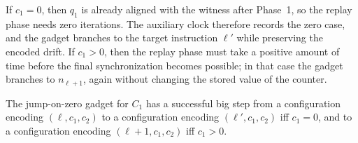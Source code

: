 If $c_1=0$, then $q_1$ is already aligned with the witness after Phase~1, so
the replay phase needs zero iterations.  The auxiliary clock therefore records
the zero case, and the gadget branches to the target instruction $\ell'$ while
preserving the encoded drift.  If $c_1>0$, then the replay phase must take a
positive amount of time before the final synchronization becomes possible; in
that case the gadget branches to $n_{\ell+1}$, again without changing the
stored value of the counter.

\begin{lemma}
\label{lem:jump}
The jump-on-zero gadget for $C_1$ has a successful big step from a configuration
encoding $(\ell,c_1,c_2)$ to a configuration encoding $(\ell',c_1,c_2)$ iff
$c_1=0$, and to a configuration encoding $(\ell+1,c_1,c_2)$ iff $c_1>0$.
\end{lemma}

